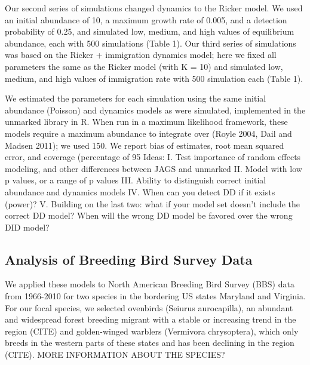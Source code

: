 \documentclass{article}
\begin{document}
Our second series of simulations changed dynamics to the
Ricker model.  We used an initial abundance of 10, a maximum
growth rate of 0.005, and a detection probability of 0.25, and
simulated low, medium, and high values of equilibrium
abundance, each with 500 simulations (Table 1).  Our third
series of simulations was based on the Ricker + immigration
dynamics model; here we fixed all parameters the same as the
Ricker model (with K = 10) and simulated low, medium, and high
values of immigration rate with 500 simulation each (Table
1).

We estimated the parameters for each simulation using the same
initial abundance (Poisson) and dynamics models as were
simulated, implemented in the unmarked library in R.  When run
in a maximum likelihood framework, these models require a
maximum abundance to integrate over (Royle 2004, Dail and
Madsen 2011); we used 150.  We report bias of estimates, root
mean squared error, and coverage (percentage of 95%
Ideas:
I.	Test importance of random effects modeling, and other differences between JAGS and unmarked
II.	Model with low p values, or a range of p values
III.	Ability to distinguish correct initial abundance and dynamics models
IV.	When can you detect DD if it exists (power)?
V.	Building on the last two: what if your model set doesn't
include the correct DD model?  When will the wrong DD model be favored
over the wrong DID model?



\subsection{Analysis of Breeding Bird Survey Data}

We applied these models to North American Breeding Bird Survey (BBS)
data from 1966-2010 for two species in the bordering US states
Maryland and Virginia.  For our focal species, we selected ovenbirds
(Seiurus aurocapilla), an abundant and widespread forest breeding
migrant with a stable or increasing trend in the region (CITE) and
golden-winged warblers (Vermivora chrysoptera), which only breeds in
the western parts of these states and has been declining in the region
(CITE).  MORE INFORMATION ABOUT THE SPECIES?
\end{document}
